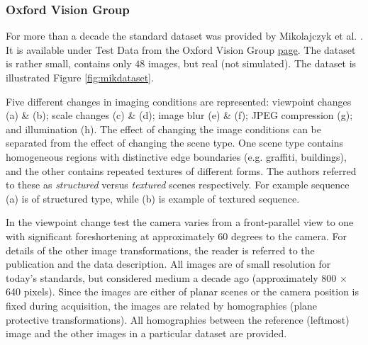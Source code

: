 \subsubsection{Oxford Vision Group}

For more than a decade the standard dataset was provided by Mikolajczyk et al. \cite{Mikolajczyk:2005}. It is available under Test Data from the Oxford Vision Group \href{http://www.robots.ox.ac.uk/~vgg/research/affine/index.html}{\underline{page}}. The dataset is rather small, contains only $48$ images, but real (not simulated). The dataset is illustrated Figure \ref{fig:mikdataset}. 

 Five different changes in imaging conditions are represented: viewpoint changes (a) \& (b); scale changes (c) \& (d); image blur (e) \& (f); JPEG compression (g); and illumination (h). The effect of changing the image conditions can be separated from
the effect of changing the scene type. One scene type contains homogeneous regions with distinctive edge boundaries (e.g. graffiti, buildings), and the other contains
repeated textures of different forms. The authors referred to these as {\em structured} versus {\em textured} scenes respectively. For example sequence (a) is of structured type, while (b) is example of textured sequence.

In the viewpoint change test the camera varies from a front-parallel view to one with significant foreshortening
at approximately 60 degrees to the camera. For details of the other image transformations, the reader is referred to the publication \cite{Mikolajczyk:2005} and the data description.   All images are of small resolution for today's standards, but considered medium a decade ago (approximately 800 $\times$ 640 pixels).
Since the images are either of planar scenes or the camera position is fixed during acquisition, the images are related by homographies (plane
protective transformations). All homographies between the reference (leftmost) image and the other images in a particular dataset are provided.

